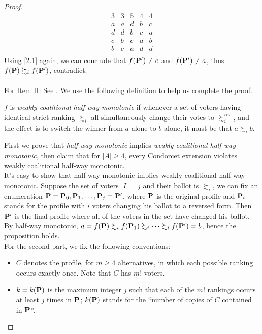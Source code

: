 \begin{proof}
$$\begin{array}{ccccc}
        3 & 3 & 5 & 4 & 4\\
        \hline
        a & a & d & b & c\\
        d & d & b & c & a\\
        c & b & c & a & b\\
        b & c & a & d & d\\
    \end{array}$$
    Using \ref{2.1} again, we can conclude that $f(\mathbf{P}') \neq c$ and $f(\mathbf{P}') \neq a$, thus $f(\mathbf{P}) \succsim_i f(\mathbf{P}')$, contradict.\\
    ~\\
    For Item II: See \textcite{sanverOnewayMonotonicityForm2009}. We use the following definition to help us complete the proof.
    \begin{definition}
        $f$ is \textit{weakly coalitional half-way monotonic} if whenever a set of voters having identical strict ranking $\succsim_i$ all simultaneously change their votes to $\succsim^{rev}_i$, and the effect is to switch the winner from $a$ alone to $b$ alone, it must be that $a \succsim_i b$.
    \end{definition}
    First we prove that \emph{half-way monotonic} implies \emph{weakly coalitional half-way monotonic}, then claim that for $|A| \geq 4$, every Condorcet extension violates weakly coalitional half-way monotonic.\\
    It's easy to show that half-way monotonic implies weakly coalitional half-way monotonic. Suppose the set of voters $|I| = j$ and their ballot is $\succsim_i$, we can fix an enumeration $\mathbf{P} = \mathbf{P}_0, \mathbf{P}_1, \dots, \mathbf{P}_j = \mathbf{P}'$, where $\mathbf{P}$ is the original profile and $\mathbf{P}_i$ stands for the profile with $i$ voters changing his ballot to a reversed form. Then $\mathbf{P}'$ is the final profile where all of the voters in the set have changed his ballot. By half-way monotonic, $a=f(\mathbf{P}) \succsim_i f(\mathbf{P}_1) \succsim_i \dots \succsim_i f(\mathbf{P}')=b$, hence the proposition holds.\\
    For the second part, we fix the following conventions:
    \begin{itemize}
        \item $C$ denotes the profile, for $m \geq 4$ alternatives, in which each possible ranking occurs exactly once. Note that $C$ has $m!$ voters.
        \item $k = k(\mathbf{P})$ is the maximum integer $j$ such that each of the $m!$ rankings occurs at least $j$ times in $\mathbf{P}$; $k(\mathbf{P})$ stands for the ``number of copies of $C$ contained in $\mathbf{P}$''.

\end{itemize}
\end{proof}

